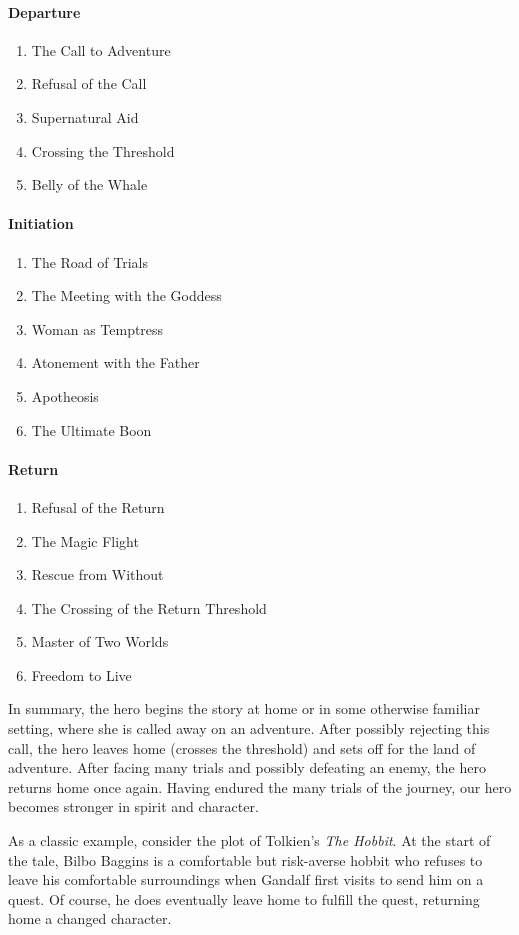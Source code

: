 \documentclass[11pt]{report}
\newcounter{myenumi}
\newenvironment{myenumerate}{\begin{enumerate} \setcounter{enumi}{\themyenumi}}{ \setcounter{myenumi}{\theenumi}\end{enumerate}}
\begin{document}
\paragraph{Departure}
\begin{myenumerate}
  \item The Call to Adventure
  \item Refusal of the Call
  \item Supernatural Aid
  \item Crossing the Threshold
  \item Belly of the Whale
\end{myenumerate}
\paragraph{Initiation}
\begin{myenumerate}
  \item The Road of Trials
  \item The Meeting with the Goddess
  \item Woman as Temptress
  \item Atonement with the Father
  \item Apotheosis
  \item The Ultimate Boon
\end{myenumerate}
\paragraph{Return}
\begin{myenumerate}
  \item Refusal of the Return
  \item The Magic Flight
  \item Rescue from Without
  \item The Crossing of the Return Threshold
  \item Master of Two Worlds
  \item Freedom to Live
\end{myenumerate}

In summary, the hero begins the story at home or in some otherwise familiar
setting, where she is called away on an adventure. After possibly rejecting this
call, the hero leaves home (crosses the threshold) and sets off for the land of adventure. After facing
many trials and possibly defeating an enemy, the hero returns home once again.
Having endured the many trials of the journey, our hero becomes stronger in spirit
and character.

As a classic example, consider the plot of Tolkien's \emph{The Hobbit}. At the
start of the tale, Bilbo Baggins is a comfortable but risk-averse hobbit who
refuses to leave his comfortable surroundings when Gandalf first visits to
send him on a quest. Of course, he does eventually leave home to fulfill the
quest, returning home a changed character.
\end{document}
